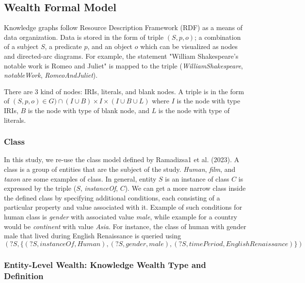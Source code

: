 \subsection{Wealth Formal Model}
Knowledge graphs follow Resource Description Framework (RDF) as a means of data organization. Data is stored in the form of triple \((S, p, o)\); a combination of a subject \(S\), a predicate \(p\), and an object \(o\) which can be visualized as nodes and directed-arc diagrams. For example, the statement "William Shakespeare's notable work is Romeo and Juliet" is mapped to the triple (\textit{WilliamShakespeare}, \textit{notableWork}, \textit{RomeoAndJuliet}).

There are 3 kind of nodes: IRIs, literals, and blank nodes. A triple is in the form of \((S, p, o) \in G) \cap (I \cup B) \times I \times (I \cup B \cup L) \) where \(I\) is the node with type IRIs, \(B\) is the node with type of blank node, and \(L\) is the node with type of literals.

\subsubsection{Class}
In this study, we re-use the class model defined by Ramadizsa1 et al. (2023). A class is a group of entities that are the subject of the study. \textit{Human}, \textit{film}, and \textit{taxon} are some examples of class. In general, entity \(S\) is an instance of class \(C\) is expressed by the triple (\(S\), \textit{instanceOf}, \(C\)). We can get a more narrow class inside the defined class by specifying additional conditions, each consisting of a particular property and value associated with it. Example of such conditions for human class is \textit{gender} with associated value \textit{male}, while example for a country would be \textit{continent} with value \textit{Asia}. For instance, the class of human with gender male that lived during English Renaissance is queried using
\[
    (?S, \{(?S, instanceOf, Human), (?S, gender, male), (?S, timePeriod, EnglishRenaissance)\})
\]

\subsubsection{Entity-Level Wealth: Knowledge Wealth Type and Definition}


